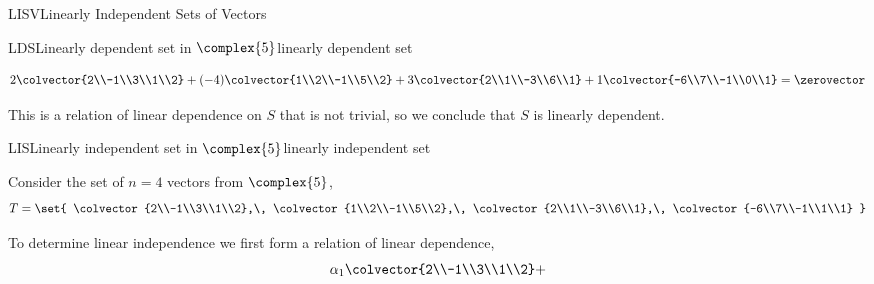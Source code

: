 \begin{subsect}{LISV}{Linearly Independent Sets of Vectors}
\begin{example}{LDS}{Linearly dependent set in $\complex{5}$}{linearly dependent set}
\begin{para}
\begin{equation*}
2\colvector{2\\-1\\3\\1\\2}+
(-4)\colvector{1\\2\\-1\\5\\2}+
3\colvector{2\\1\\-3\\6\\1}+
1\colvector{-6\\7\\-1\\0\\1}
=\zerovector
\end{equation*}
\end{para}
%
\begin{para}This is a relation of linear dependence on $S$ that is not trivial, so we conclude that $S$ is linearly dependent.
\end{para}
%
\end{example}
%
\begin{example}{LIS}{Linearly independent set in $\complex{5}$}{linearly independent set}
\begin{para}Consider the set of $n=4$ vectors from $\complex{5}$,
%
\begin{equation*}
T=\set{
\colvector{2\\-1\\3\\1\\2},\,
\colvector{1\\2\\-1\\5\\2},\,
\colvector{2\\1\\-3\\6\\1},\,
\colvector{-6\\7\\-1\\1\\1}
}
\end{equation*}
\end{para}
%
\begin{para}To determine linear independence we first form a relation of linear dependence,
%
\begin{equation*}
\alpha_1\colvector{2\\-1\\3\\1\\2}+

\end{equation*}
\end{para}
\end{example}
\end{subsect}
